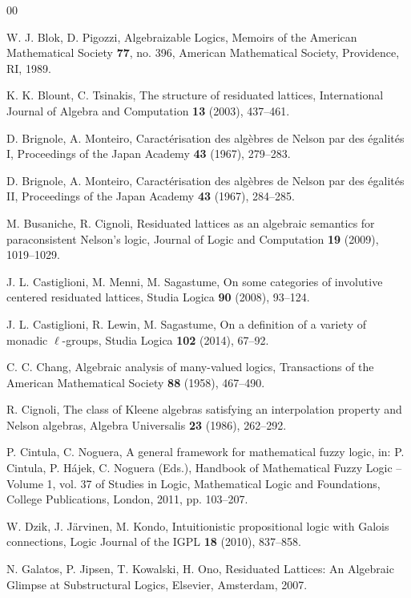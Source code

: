 \documentclass[final,12pt,times]{elsarticle}
\theoremstyle{plain}
\theoremstyle{definition}
\theoremstyle{break}
\begin{document}
\begin{thebibliography}{00}

 W. J. Blok, D. Pigozzi, Algebraizable Logics, Memoirs of the American Mathematical Society \textbf{77}, no. 396, American Mathematical Society, Providence, RI, 1989.

 K. K. Blount, C. Tsinakis, The structure of residuated lattices, International Journal of Algebra and Computation \textbf{13} (2003), 437--461.

 D. Brignole, A. Monteiro, Caractérisation des algèbres de Nelson par des égalités I, Proceedings of the Japan Academy \textbf{43} (1967), 279--283.

 D. Brignole, A. Monteiro, Caractérisation des algèbres de Nelson par des égalités II, Proceedings of the Japan Academy \textbf{43} (1967), 284--285.

 M. Busaniche, R. Cignoli, Residuated lattices as an algebraic semantics for paraconsistent Nelson's logic, Journal of Logic and Computation \textbf{19} (2009), 1019--1029.

 J. L. Castiglioni, M. Menni, M. Sagastume, On some categories of involutive centered residuated lattices, Studia Logica \textbf{90} (2008), 93--124.

 J. L. Castiglioni, R. Lewin, M. Sagastume, On a definition of a variety of monadic $\ell$-groups, Studia Logica \textbf{102} (2014), 67--92.

 C. C. Chang, Algebraic analysis of many-valued logics, Transactions of the American Mathematical Society \textbf{88} (1958), 467--490.

 R. Cignoli, The class of Kleene algebras satisfying an interpolation property and Nelson algebras, Algebra Universalis \textbf{23} (1986), 262--292.

 P. Cintula, C. Noguera, A general framework for mathematical fuzzy logic, in: P. Cintula, P. Hájek, C. Noguera (Eds.), Handbook of Mathematical Fuzzy Logic -- Volume 1, vol. 37 of Studies in Logic, Mathematical Logic and Foundations, College Publications, London, 2011, pp. 103--207.

 W. Dzik, J. J\"arvinen, M. Kondo, Intuitionistic propositional logic with Galois connections, Logic Journal of the IGPL \textbf{18} (2010), 837--858.

 N. Galatos, P. Jipsen, T. Kowalski, H. Ono, Residuated Lattices: An Algebraic Glimpse at Substructural Logics, Elsevier, Amsterdam, 2007.


\end{thebibliography}
\end{document}
